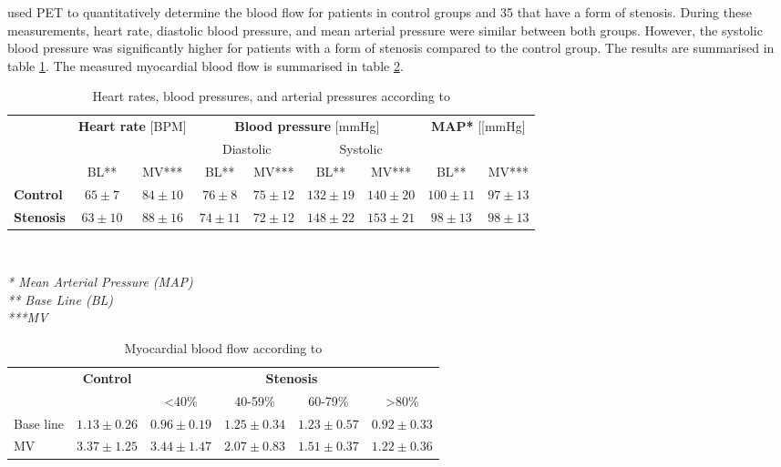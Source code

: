 \cite{uren1994relation} used \ac{PET} to quantitatively determine the blood flow for patients in control groups and 35 that have a form of stenosis. During these measurements, heart rate, diastolic blood pressure, and mean arterial pressure were similar between both groups. However, the systolic blood pressure was significantly higher for patients with a form of stenosis compared to the control group. The results are summarised in table \ref{tab:urenValues}. The measured myocardial blood flow is summarised in table \ref{tab:urenFlows}.

\begin{table} [h!]
	\begin{tabular}{l|c|c|c|c|c|c|c|c}
		\multicolumn{1}{c}{ } &\multicolumn{2}{c}{\textbf{Heart rate} [BPM]}  & \multicolumn{4}{c}{\textbf{Blood pressure} [mmHg]} & \multicolumn{2}{c}{\textbf{MAP*} [[mmHg]} \\
		\multicolumn{1}{c}{ }& \multicolumn{2}{c}{ } &  \multicolumn{2}{c}{Diastolic} & \multicolumn{2}{c}{Systolic} & \multicolumn{2}{c}{ } \\
		\multicolumn{1}{c|}{ }& \multicolumn{1}{c}{BL**} & \multicolumn{1}{c|}{\acs{MV}***} & \multicolumn{1}{c}{BL**} & \multicolumn{1}{c|}{\acs{MV}***} & \multicolumn{1}{c}{BL**} & \multicolumn{1}{c|}{\acs{MV}***} & \multicolumn{1}{c}{BL**} & \multicolumn{1}{c|}{\acs{MV}***}\\
		\hline
		\textbf{Control} 	& $65\pm 7$ 	& $84\pm 10$	& $76\pm 8$	& $75\pm 12$	& $132\pm 19$	& $140\pm 20$ 	& $ 100\pm 11 $ & $97\pm 13$\\
		\textbf{Stenosis} 	& $63 \pm 10$ 	& $88\pm 16$	& $74\pm 11$	& $72\pm 12$	& $148\pm 22$	& $153\pm 21$  & $98\pm 13$	& $98 \pm 13$\\
		\hline
	\end{tabular} \\
	\raggedright
	\textit{* Mean Arterial Pressure (MAP)}\\
	\textit{** Base Line (BL)}\\
	\textit{***\acf{MV}}
	\caption{Heart rates, blood pressures, and arterial pressures according to \cite{uren1994relation}}
	\label{tab:urenValues}
\end{table}

\begin{table}[h!]
\begin{tabular}{l|c|c|c|c|c|}
          \multicolumn{1}{c}{ } & \multicolumn{1}{c}{\textbf{Control}} & \multicolumn{4}{c}{\textbf{Stenosis}}                             \\
          &         & \textless{}40\% & 40-59\% & 60-79\% & \textgreater{}80\% \\
          \hline
Base line &     $1.13\pm 0.26$    &         $0.96\pm 0.19$        &    $1.25\pm 0.34$     &    $1.23\pm 0.57$     &	$0.92\pm 0.33$\\
MV        &     $3.37\pm 1.25$    &  $3.44\pm 1.47$  &   $2.07\pm 0.83$          &    $1.51\pm 0.37$     & $1.22\pm 0.36$
\end{tabular}
\caption{Myocardial blood flow according to \cite{uren1994relation}}
\label{tab:urenFlows}
\end{table}


